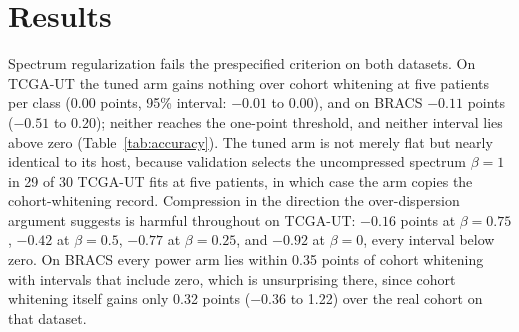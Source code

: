 \section{Results}
\label{sec:results}
Spectrum regularization fails the prespecified criterion on both datasets. On TCGA-UT the tuned arm gains nothing over cohort whitening at five patients per class (0.00 points, 95\% interval: $-0.01$ to 0.00), and on BRACS $-0.11$ points ($-0.51$ to 0.20); neither reaches the one-point threshold, and neither interval lies above zero (Table~\ref{tab:accuracy}). The tuned arm is not merely flat but nearly identical to its host, because validation selects the uncompressed spectrum $\beta=1$ in 29 of 30 TCGA-UT fits at five patients, in which case the arm copies the cohort-whitening record. Compression in the direction the over-dispersion argument suggests is harmful throughout on TCGA-UT: $-0.16$ points at $\beta=0.75$, $-0.42$ at $\beta=0.5$, $-0.77$ at $\beta=0.25$, and $-0.92$ at $\beta=0$, every interval below zero. On BRACS every power arm lies within 0.35 points of cohort whitening with intervals that include zero, which is unsurprising there, since cohort whitening itself gains only 0.32 points ($-0.36$ to 1.22) over the real cohort on that dataset.


